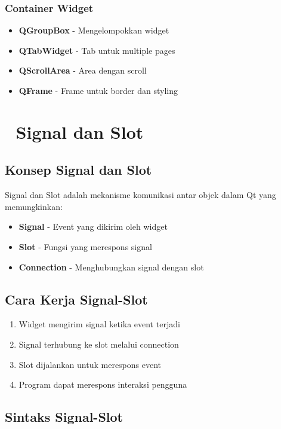 \subsubsection{Container Widget}
\begin{itemize}
\item \textbf{QGroupBox} - Mengelompokkan widget
\item \textbf{QTabWidget} - Tab untuk multiple pages
\item \textbf{QScrollArea} - Area dengan scroll
\item \textbf{QFrame} - Frame untuk border dan styling
\end{itemize}

\section{🔗 Signal dan Slot}

\subsection{Konsep Signal dan Slot}

Signal dan Slot adalah mekanisme komunikasi antar objek dalam Qt yang memungkinkan:
\begin{itemize}
\item \textbf{Signal} - Event yang dikirim oleh widget
\item \textbf{Slot} - Fungsi yang merespons signal
\item \textbf{Connection} - Menghubungkan signal dengan slot
\end{itemize}

\subsection{Cara Kerja Signal-Slot}

\begin{enumerate}
\item Widget mengirim signal ketika event terjadi
\item Signal terhubung ke slot melalui connection
\item Slot dijalankan untuk merespons event
\item Program dapat merespons interaksi pengguna
\end{enumerate}

\subsection{Sintaks Signal-Slot}

